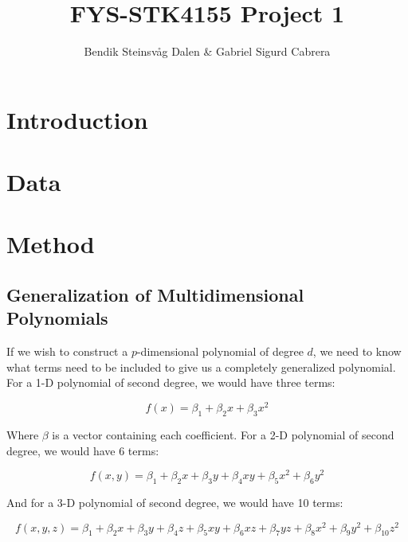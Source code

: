 \documentclass[a4paper,10pt,english]{article}
\begin{document}
\title{FYS-STK4155 Project 1}
\author{Bendik Steinsvåg Dalen \& Gabriel Sigurd Cabrera}
\maketitle

\begin{abstract}

\end{abstract}

\section*{Introduction}
\label{sec:introduction}

\section*{Data}
\label{sec:method}

\section*{Method}
\label{sec:method}

	\subsection*{Generalization of Multidimensional Polynomials}
	
	If we wish to construct a $p$-dimensional polynomial of degree $d$, we need to know what terms need to be included to give us a completely generalized polynomial.  For a 1-D polynomial of second degree, we would have three terms:
	
	\begin{equation*}
	f(x) = \beta_1 + \beta_2 x + \beta_3 x^2
	\end{equation*}
	
	Where $\beta$ is a vector containing each coefficient.	For a 2-D polynomial of second degree, we would have 6 terms:
	
	\begin{equation*}
	f(x,y) = \beta_1 + \beta_2 x + \beta_3 y + \beta_4 xy + \beta_5 x^2 + \beta_6 y^2
	\end{equation*}
	
	And for a 3-D polynomial of second degree, we would have 10 terms:
	
	\begin{equation*}
	f(x,y,z) = \beta_1 + \beta_2 x + \beta_3 y + \beta_4 z + \beta_5 xy + \beta_6 xz + \beta_7 yz + \beta_8 x^2 + \beta_9 y^2 + \beta_{10} z^2
	\end{equation*}
	
\end{document}
